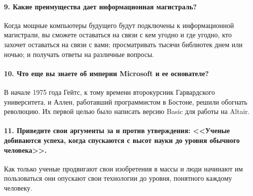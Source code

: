 \documentclass[a5paper, 12pt, twoside]{extreport}
\begin{document}
    \paragraph{9. Какие преимущества дает информационная магистраль?}
    Когда мощные компьютеры будущего будут подключены к информационной магистрали, вы сможете оставаться на связи с кем угодно и где угодно, кто захочет оставаться на связи с вами; просматривать тысячи библиотек днем или ночью; и получать ответы на различные вопросы.
    
    \paragraph{10. Что еще вы знаете об империи Microsoft и ее основателе?}
    В начале 1975 года Гейтс, к тому времени второкурсник Гарвардского университета, и Аллен, работавший программистом в Бостоне, решили обогнать революцию. Их первой целью было написать версию Basic для работы на Altair.
    
    \paragraph{11. Приведите свои аргументы за и против утверждения: <<Ученые добиваются успеха, когда спускаются с высот науки до уровня обычного человека>>.} 
    Как только ученые продвигают свои изобретения в массы и люди начинают им пользоваться они опускают свои технологии до уровня, понятного каждому человеку.
\end{document}
